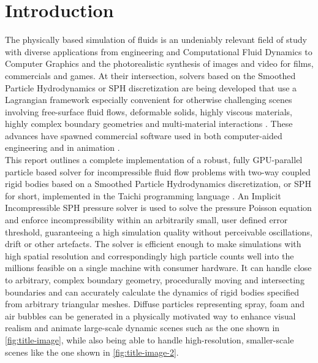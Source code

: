 \documentclass[oneside, a4paper]{book}
\begin{document}
\tableofcontents
\newpage

\chapter{Introduction}

The physically based simulation of fluids is an undeniably relevant field of study with diverse applications from engineering and Computational Fluid Dynamics to Computer Graphics and the photorealistic synthesis of images and video for films, commercials and games. At their intersection, solvers based on the Smoothed Particle Hydrodynamics or SPH discretization are being developed that use a Lagrangian framework especially convenient for otherwise challenging scenes involving free-surface fluid flows, deformable solids, highly viscous materials, highly complex boundary geometries and multi-material interactions \autocite{tutorial2019}. These advances have spawned commercial software used in both computer-aided engineering and in animation \autocite{tutorial2019}.\\

This report outlines a complete implementation of a robust, fully GPU-parallel particle based solver for incompressible fluid flow problems with two-way coupled rigid bodies based on a Smoothed Particle Hydrodynamics discretization, or SPH for short, implemented in the Taichi programming language \autocite{taichi-sparse}. An Implicit Incompressible SPH pressure solver is used to solve the pressure Poisson equation and enforce incompressibility within an arbitrarily small, user defined error threshold, guaranteeing a high simulation quality without perceivable oscillations, drift or other artefacts. The solver is efficient enough to make simulations with high spatial resolution and correspondingly high particle counts well into the millions feasible on a single machine with consumer hardware. It can handle close to arbitrary, complex boundary geometry, procedurally moving and intersecting boundaries and can accurately calculate the dynamics of rigid bodies specified from arbitrary triangular meshes. Diffuse particles representing spray, foam and air bubbles can be generated in a physically motivated way to enhance visual realism and animate large-scale dynamic scenes such as the one shown in \autoref{fig:title-image}, while also being able to handle high-resolution, smaller-scale scenes like the one shown in \autoref{fig:title-image-2}.\\
\end{document}
